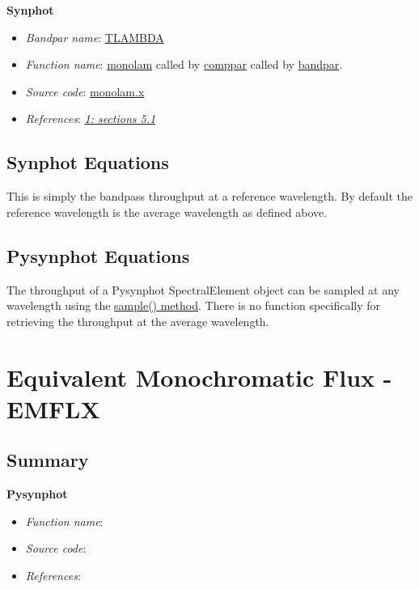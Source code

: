 \documentclass[letterpaper,10pt,english]{sphinxtsr}
\begin{document}
\textbf{Synphot}
\begin{itemize}
\item {} 
\emph{Bandpar name}: \href{https://svn.stsci.edu/trac/ssb/stsci\_python/browser/stsdas/trunk/stsdas/pkg/hst\_calib/synphot/doc/bandpar.hlp}{TLAMBDA}

\item {} 
\emph{Function name}: \href{https://svn.stsci.edu/trac/ssb/stsci\_python/browser/stsdas/trunk/stsdas/pkg/hst\_calib/synphot/newlib/monolam.x}{monolam}
called by \href{https://svn.stsci.edu/trac/ssb/stsci\_python/browser/stsdas/trunk/stsdas/pkg/hst\_calib/synphot/bandpar/comppar.x}{comppar} called by \href{https://svn.stsci.edu/trac/ssb/stsci\_python/browser/stsdas/trunk/stsdas/pkg/hst\_calib/synphot/bandpar/bandpar.x}{bandpar}.

\item {} 
\emph{Source code}: \href{https://svn.stsci.edu/trac/ssb/stsci\_python/browser/stsdas/trunk/stsdas/pkg/hst\_calib/synphot/newlib/monolam.x}{monolam.x}

\item {} 
\emph{References}: {\hyperref[references:ref1]{\emph{1: sections 5.1}}}

\end{itemize}


\section{Synphot Equations}
\label{main:id41}
This is simply the bandpass throughput at a reference wavelength. By default
the reference wavelength is the average wavelength as defined above.


\section{Pysynphot Equations}
\label{main:id42}
The throughput of a Pysynphot SpectralElement object can be sampled at any
wavelength using the \href{https://trac.assembla.com/astrolib/browser/trunk/pysynphot/lib/pysynphot/spectrum.py\#L1251}{sample() method}.
There is no function specifically for retrieving the throughput at the
average wavelength.


\chapter{Equivalent Monochromatic Flux - EMFLX}
\label{main:equivalent-monochromatic-flux-emflx}

\section{Summary}
\label{main:id43}
\textbf{Pysynphot}
\begin{itemize}
\item {} 
\emph{Function name}:

\item {} 
\emph{Source code}:

\item {} 
\emph{References}:

\end{itemize}
\end{document}
